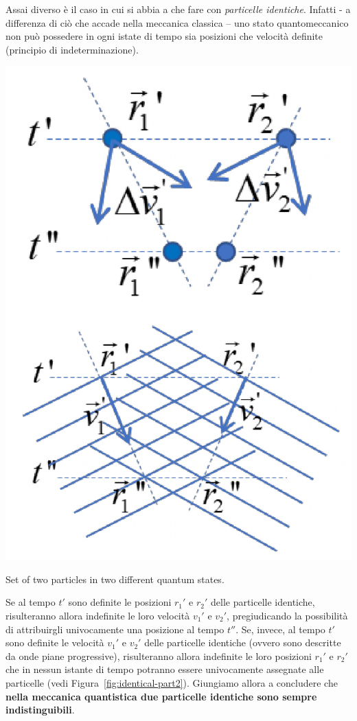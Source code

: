 Assai diverso è il caso in cui si abbia a che fare con \emph{particelle identiche}. Infatti - a differenza di ciò che accade nella meccanica classica – uno stato quantomeccanico non può possedere in ogni istate di tempo sia posizioni che velocità definite (principio di indeterminazione).
\begin{marginfigure}
    \includegraphics{figs/identical-part2}
    \caption{Set of two particles in two different quantum states.}
    \label{fig:identical-part2}
\end{marginfigure}
Se al tempo $t'$ sono definite le posizioni $r_{1}'$ e $r_{2}'$ delle particelle identiche, risulteranno allora indefinite le loro velocità $v_{1}'$ e $v_{2}'$, pregiudicando la possibilità di attribuirgli univocamente una posizione al tempo $t''$. Se, invece, al tempo $t'$ sono definite le velocità $v_{1}'$ e $v_{2}'$ delle particelle identiche (ovvero sono descritte da onde piane progressive), risulteranno allora indefinite le loro posizioni $r_{1}'$ e $r_{2}'$ che in nessun istante di tempo potranno essere univocamente assegnate alle particelle (vedi Figura~\ref{fig:identical-part2}). Giungiamo allora a concludere che \textbf{nella meccanica quantistica due particelle identiche sono sempre indistinguibili}.

